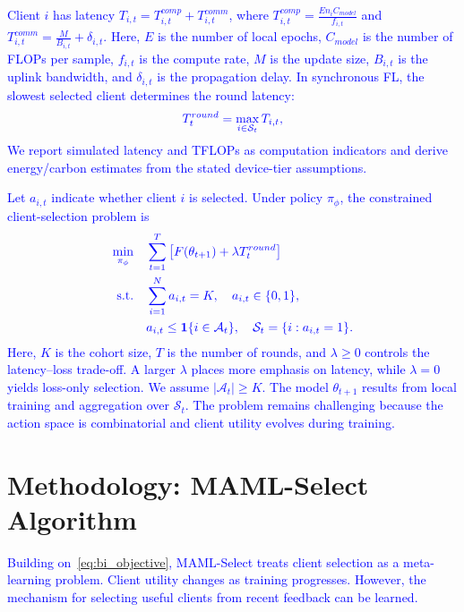 \documentclass[journal]{IEEEtran}
\newcommand{\revision}[1]{\textcolor{blue}{#1}}
\begin{document}
\revision{Client $i$ has latency $T_{i,t}=T_{i,t}^{comp}+T_{i,t}^{comm}$, where $T_{i,t}^{comp} = \frac{E n_i C_{model}}{f_{i,t}}$ and $T_{i,t}^{comm} = \frac{M}{B_{i,t}} + \delta_{i,t}$. Here, $E$ is the number of local epochs, $C_{model}$ is the number of FLOPs per sample, $f_{i,t}$ is the compute rate, $M$ is the update size, $B_{i,t}$ is the uplink bandwidth, and $\delta_{i,t}$ is the propagation delay. In synchronous FL, the slowest selected client determines the round latency:}
\begin{equation}
	\color{blue}
	T_t^{round} = \max_{i \in \mathcal{S}_t} T_{i,t},
	\label{eq:round_latency}
\end{equation}
\revision{We report simulated latency and TFLOPs as computation indicators and derive energy/carbon estimates from the stated device-tier assumptions.}

\revision{Let $a_{i,t}$ indicate whether client $i$ is selected. Under policy $\pi_\phi$, the constrained client-selection problem is}
\begin{equation}
	\color{blue}
	\begin{aligned}
		\min_{\pi_\phi}\quad & \sum_{t=1}^{T} \left[F(\theta_{t+1}) + \lambda T_t^{round}\right] \\
		\text{s.t.}\quad & \sum_{i=1}^{N} a_{i,t}=K,\quad a_{i,t}\in\{0,1\}, \\
		& a_{i,t}\leq \mathbf{1}\{i\in\mathcal{A}_t\},\quad
		\mathcal{S}_t=\{i:a_{i,t}=1\}.
	\end{aligned}
	\label{eq:bi_objective}
\end{equation}
\revision{Here, $K$ is the cohort size, $T$ is the number of rounds, and $\lambda \geq 0$ controls the latency--loss trade-off. A larger $\lambda$ places more emphasis on latency, while $\lambda=0$ yields loss-only selection. We assume $|\mathcal{A}_t|\geq K$. The model $\theta_{t+1}$ results from local training and aggregation over $\mathcal{S}_t$. The problem remains challenging because the action space is combinatorial and client utility evolves during training.}

\section{Methodology: MAML-Select Algorithm}
\revision{Building on~\eqref{eq:bi_objective}, MAML-Select treats client selection as a meta-learning problem. Client utility changes as training progresses. However, the mechanism for selecting useful clients from recent feedback can be learned.}
\end{document}
